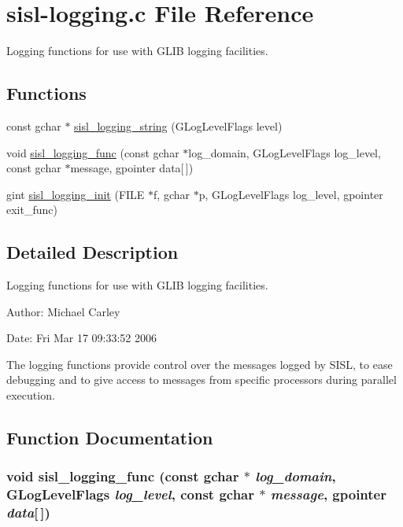 \hypertarget{sisl-logging_8c}{
\section{sisl-logging.c File Reference}
\label{sisl-logging_8c}
}
Logging functions for use with GLIB logging facilities. 

\subsection*{Functions}
\begin{CompactItemize}
\item 
const gchar $\ast$ \hyperlink{sisl-logging_8c_a0}{sisl\_\-logging\_\-string} (GLog\-Level\-Flags level)
\item 
void \hyperlink{sisl-logging_8c_a1}{sisl\_\-logging\_\-func} (const gchar $\ast$log\_\-domain, GLog\-Level\-Flags log\_\-level, const gchar $\ast$message, gpointer data\mbox{[}$\,$\mbox{]})
\item 
gint \hyperlink{sisl-logging_8c_a2}{sisl\_\-logging\_\-init} (FILE $\ast$f, gchar $\ast$p, GLog\-Level\-Flags log\_\-level, gpointer exit\_\-func)
\end{CompactItemize}


\subsection{Detailed Description}
Logging functions for use with GLIB logging facilities. 

\begin{Desc}
\item[Author:]Michael Carley \end{Desc}
\begin{Desc}
\item[Date:]Fri Mar 17 09:33:52 2006\end{Desc}


The logging functions provide control over the messages logged by SISL, to ease debugging and to give access to messages from specific processors during parallel execution.

\subsection{Function Documentation}
\hypertarget{sisl-logging_8c_a1}{
\subsubsection[sisl\_\-logging\_\-func]{\setlength{\rightskip}{0pt plus 5cm}void sisl\_\-logging\_\-func (const gchar $\ast$ {\em log\_\-domain}, GLog\-Level\-Flags {\em log\_\-level}, const gchar $\ast$ {\em message}, gpointer {\em data}\mbox{[}$\,$\mbox{]})}}
\label{sisl-logging_8c_a1}


